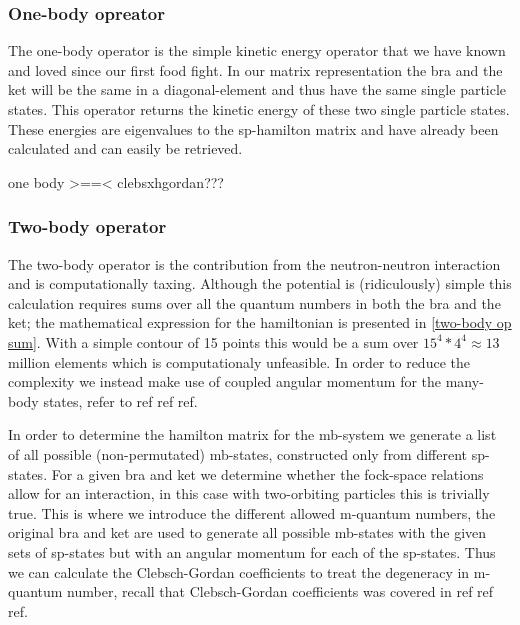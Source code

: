 \subsubsection{One-body opreator}
The one-body operator is the simple kinetic energy operator that we have known and loved since our first food fight. 
 In our matrix representation the bra and the ket will be the same in a diagonal-element and thus have the same single particle states.
 This operator returns the kinetic energy of these two single particle states. 
 These energies are eigenvalues to the sp-hamilton matrix and have already been calculated and can easily be retrieved.

one body >==< clebsxhgordan???

\subsubsection{Two-body operator}
The two-body operator is the contribution from the neutron-neutron interaction and is computationally taxing. Although the potential is (ridiculously) simple this calculation requires sums over all the quantum numbers in both the bra and the ket; the mathematical expression for the hamiltonian is presented in \cref{two-body op sum}. 
With a simple contour of 15 points this would be a sum over $15^4*4^4 \approx 13$ million elements which is computationaly unfeasible.
In order to reduce the complexity we instead make use of coupled angular momentum for the many-body states, refer to ref ref ref.



In order to determine the hamilton matrix for the mb-system we generate a list of all possible (non-permutated) mb-states, constructed only from different sp-states.
For a given bra and ket we determine whether the fock-space relations allow for an interaction, in this case with two-orbiting particles this is trivially true.
This is where we introduce the different allowed m-quantum numbers, the original bra and ket are used to generate all possible mb-states with the given sets of sp-states but with an angular momentum for each of the sp-states.
Thus we can calculate the Clebsch-Gordan coefficients to treat the degeneracy in m-quantum number, recall that Clebsch-Gordan coefficients was covered in ref ref ref.

